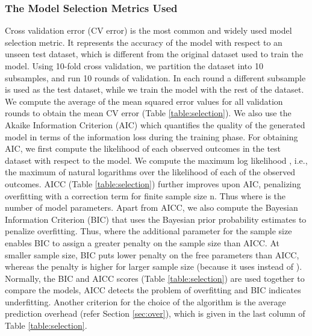 \documentclass[conference]{IEEEtran}
\begin{document}
\subsubsection{The Model Selection Metrics Used}\label{sec:metricsused}
Cross validation error (CV error) \cite{Flach:2012:MLA:2490546} is the most common and widely used model selection metric. It represents the accuracy of the model with respect to an unseen test dataset, which is different from the original dataset used to train the model.  Using 10-fold cross validation, we partition the dataset into 10 subsamples, and run 10 rounds of validation. In each round a different subsample is used as the test dataset, while we train the model with the rest of the dataset. We compute the average of the mean squared error values for all validation rounds to obtain the mean CV error (Table \ref{table:selection}).
  We also use the Akaike Information Criterion (AIC) \cite{burnham2002model} which quantifies the quality of the generated model in terms of the information loss during the  training phase. For obtaining AIC, we first compute the likelihood of each observed outcomes in the test dataset with respect to the model. We compute the maximum log likelihood , i.e.,  the maximum of natural logarithms over the likelihood of each of the observed outcomes. AICC \cite{burnham2002model} (Table \ref{table:selection}) further improves upon AIC, penalizing overfitting with a correction term for finite sample size n. Thus  where  is the number of model parameters.
  Apart from AICC, we also compute the Bayesian Information Criterion (BIC) \cite{burnham2002model} that uses the Bayesian prior probability estimates to penalize overfitting. Thus,  where the additional parameter  for the sample size enables BIC to assign a greater penalty on the sample size than AICC. At smaller sample size, BIC puts lower penalty on the free parameters than AICC, whereas the penalty is higher for larger sample size (because it uses  instead of ). Normally, the BIC and AICC scores (Table \ref{table:selection}) are used together to compare the models, AICC detects the problem of overfitting and BIC indicates underfitting. Another criterion for the choice of the algorithm is the average prediction overhead (refer Section \ref{sec:over}), which is given in the last column of Table \ref{table:selection}.
\end{document}
